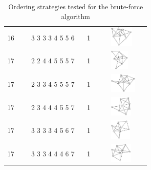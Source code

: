 \begin{table}[h!]
\begin{tabular}{m{0.15\linewidth} m{0.35\linewidth} m{0.15\linewidth} m{0.25\linewidth}}
16 & 3 3 3 3 4 5 5 6 & 1 & \includegraphics[height=1cm]{15-universal-graphs/img/degree-sequences-example-graphs/graph-4-8-151}\\
17 & 2 2 4 4 5 5 5 7 & 1 & \includegraphics[height=1cm]{15-universal-graphs/img/degree-sequences-example-graphs/graph-4-8-152}\\
17 & 2 3 3 4 5 5 5 7 & 1 & \includegraphics[height=1cm]{15-universal-graphs/img/degree-sequences-example-graphs/graph-4-8-153}\\
17 & 2 3 4 4 4 5 5 7 & 1 & \includegraphics[height=1cm]{15-universal-graphs/img/degree-sequences-example-graphs/graph-4-8-154}\\
17 & 3 3 3 3 4 5 6 7 & 1 & \includegraphics[height=1cm]{15-universal-graphs/img/degree-sequences-example-graphs/graph-4-8-155}\\
17 & 3 3 3 4 4 4 6 7 & 1 & \includegraphics[height=1cm]{15-universal-graphs/img/degree-sequences-example-graphs/graph-4-8-156}\\
\bottomrule
\end{tabular}
\caption{Ordering strategies tested for the brute-force algorithm}
\label{tab:TODO}
\end{table}


